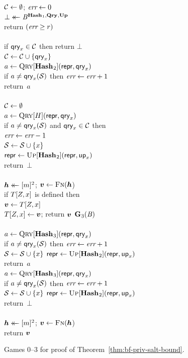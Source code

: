\begin{figure}
{      $\mathcal{C} \gets \emptyset$;
      $\textit{err} \gets 0$\\
      $\bot \mathrel{\leftarrow\mkern-14mu\leftarrow} \mathit{B}^{\mathbf{Hash}\hspace{0.5pt}_1,\mathbf{Qry}\hspace{0.5pt},\mathbf{Up}\hspace{0.5pt}}$\\
      return $(\textit{err} \geq r)$
    \\[6pt]
    \\[2pt]
      if $\mathsf{qry}_x \in \mathcal{C}$ then return $\bot$\\
      $\mathcal{C} \gets \mathcal{C} \cup \{\mathsf{qry}_x\}$\\
      $a \gets \textsc{Qry}[\mathbf{Hash}\hspace{0.5pt}_2](\mathsf{repr}, \mathsf{qry}_x)$\\
      if $a \neq \mathsf{qry}_x(\mathcal{S})$ then $\textit{err} \gets \textit{err} + 1$\\
      return~$a$
    \\[6pt]
    \\[2pt]
      $\mathcal{C} \gets \emptyset$\\
      $a \gets \textsc{Qry}[H](\mathsf{repr}, \mathsf{qry}_x)$\\
      if $a \neq \mathsf{qry}_x(\mathcal{S})$ and $\mathsf{qry}_x \in \mathcal{C}$ then\\
      \tab $\textit{err} \gets \textit{err}-1$\\
      $\mathcal{S} \gets \mathcal{S} \cup \{x\}$\\
      $\mathsf{repr} \gets \textsc{Up}[\mathbf{Hash}\hspace{0.5pt}_2](\mathsf{repr},\mathsf{up}_x)$\\
      return~$\bot$
    \\[6pt]
    \\[2pt]
      $\hh \getsr [m]^2$; $\vv \gets \fff(\hh$)\\
      if $T[Z,x]$ is defined then\\
      \tab $\vv \gets T[\salt,x]$\\
      $T[\salt,x] \gets \vv$;
      return $\vv$
  }
  {
    \underline{$\mathbf{G}\hspace{0.5pt}_3(\mathit{B})$}\\[2pt]
    \\[2pt]
      $a \gets \textsc{Qry}[\mathbf{Hash}\hspace{0.5pt}_3](\mathsf{repr}, \mathsf{qry}_x)$\\
      if $a \neq \mathsf{qry}_x(\mathcal{S})$ then $\textit{err} \gets \textit{err} + 1$\\
      $\mathcal{S} \gets \mathcal{S} \cup \{x\}$
      $\mathsf{repr} \gets \textsc{Up}[\mathbf{Hash}\hspace{0.5pt}_2](\mathsf{repr},\mathsf{up}_x)$\\
      return~$a$
  }
  {
    \\[2pt]
      $a \gets \textsc{Qry}[\mathbf{Hash}\hspace{0.5pt}_3](\mathsf{repr}, \mathsf{qry}_x)$\\
      if $a \neq \mathsf{qry}_x(\mathcal{S})$ then $\textit{err} \gets \textit{err} + 1$\\
      $\mathcal{S} \gets \mathcal{S} \cup \{x\}$
      $\mathsf{repr} \gets \textsc{Up}[\mathbf{Hash}\hspace{0.5pt}_2](\mathsf{repr},\mathsf{up}_x)$\\
      return~$\bot$
    \\[6pt]
    \\[2pt]
      $\hh \getsr [m]^2$; $\vv \gets \fff(\hh$)\\
      return $\vv$
  }
  \caption{Games 0--3 for proof of Theorem~\ref{thm:bf-priv-salt-bound}.}
  \label{fig:bf-priv-salt-bound}
\end{figure}

